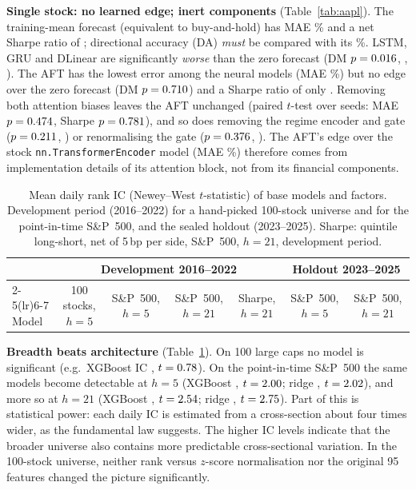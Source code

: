 \textbf{Single stock: no learned edge; inert components} (Table~\ref{tab:aapl}). The training-mean forecast (equivalent to buy-and-hold) has MAE \aMeanMae\% and a net Sharpe ratio of \aMeanSr; directional accuracy (DA) \emph{must} be compared with its \aMeanDa\%. LSTM, GRU and DLinear are significantly \emph{worse} than the zero forecast (DM $p=0.016$, \aGruDmZeroP, \aDlinDmZeroP). The AFT has the lowest error among the neural models (MAE \aAftMae\%) but no edge over the zero forecast (DM $p=0.710$) and a Sharpe ratio of only \aAftSr. Removing both attention biases leaves the AFT unchanged (paired $t$-test over seeds: MAE $p=0.474$, Sharpe $p=0.781$), and so does removing the regime encoder and gate ($p=0.211$, \aAblRegSrP) or renormalising the gate ($p=0.376$, \aAblAftrSrP). The AFT's edge over the stock \texttt{nn.TransformerEncoder} model (MAE \aTrfMae\%) therefore comes from implementation details of its attention block, not from its financial components.

\begin{table}[t]
\centering
\caption{Mean daily rank IC (Newey--West $t$-statistic) of base models and factors. Development period (2016--2022) for a hand-picked 100-stock universe and for the point-in-time S\&P~500, and the sealed holdout (2023--2025). Sharpe: quintile long-short, net of 5\,bp per side, S\&P~500, $h=21$, development period.}
\label{tab:base}
\footnotesize
\begin{tabular}{lcccccc}
\toprule
& \multicolumn{4}{c}{Development 2016--2022} & \multicolumn{2}{c}{Holdout 2023--2025} \\
\cmidrule(lr){2-5}\cmidrule(lr){6-7}
Model & 100 stocks, $h=5$ & S\&P~500, $h=5$ & S\&P~500, $h=21$ & Sharpe, $h=21$ & S\&P~500, $h=5$ & S\&P~500, $h=21$ \\
\midrule

\end{tabular}
\end{table}

\textbf{Breadth beats architecture} (Table~\ref{tab:base}). On 100 large caps no model is significant (e.g.\ XGBoost IC \tfXgbIc, $t=0.78$). On the point-in-time S\&P~500 the same models become detectable at $h=5$ (XGBoost \sfXgbIc, $t=2.00$; ridge \sfRidgeIc, $t=2.02$), and more so at $h=21$ (XGBoost \stXgbIc, $t=2.54$; ridge \stRidgeIc, $t=2.75$). Part of this is statistical power: each daily IC is estimated from a cross-section about four times wider, as the fundamental law suggests. The higher IC levels indicate that the broader universe also contains more predictable cross-sectional variation. In the 100-stock universe, neither rank versus $z$-score normalisation nor the original 95 features changed the picture significantly.


